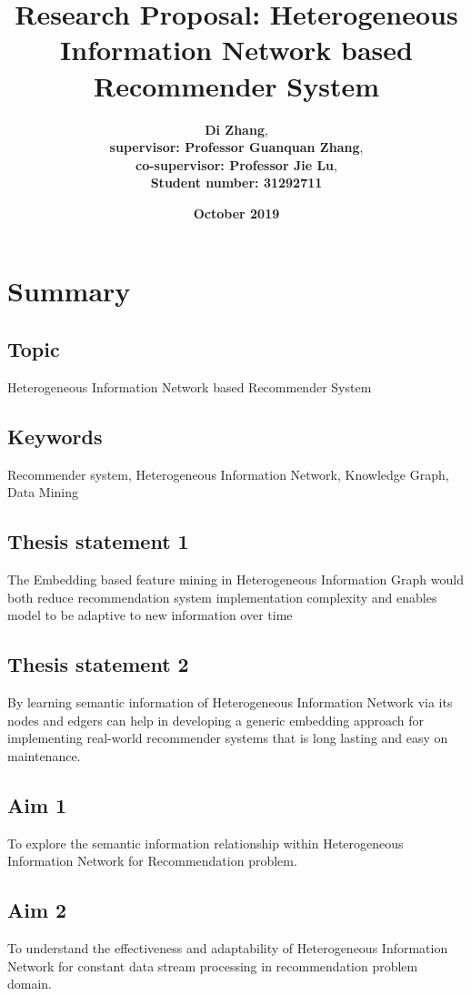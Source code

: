 \documentclass[12pt,a4 paper,title page]{article}
\title{Research Proposal: Heterogeneous Information Network based Recommender System}
\author{\large\textbf{Di Zhang}, \\
\textbf{supervisor: Professor Guanquan Zhang}, \\
\textbf{co-supervisor: Professor Jie Lu}, \\
\textbf{Student number: 31292711}}
\date{\Large{\textbf{October 2019}}}
\theoremstyle{definition}
\begin{document}
\sloppy
\maketitle
\hfill
\hfill

\section*{Summary}

\subsection*{Topic} Heterogeneous Information Network based Recommender System

\subsection*{Keywords} 

Recommender system, Heterogeneous Information Network, Knowledge Graph, Data Mining 

\subsection*{Thesis statement 1}
The Embedding based feature mining in Heterogeneous Information Graph would both reduce recommendation system implementation complexity and enables model to be adaptive to new information over time

\subsection*{Thesis statement 2}
By learning semantic information of Heterogeneous Information Network via its nodes and edgers can help in developing a generic embedding approach for implementing real-world recommender systems that is long lasting and easy on maintenance. 

\subsection*{Aim 1}
To explore the semantic information relationship within Heterogeneous Information Network for Recommendation problem.

\subsection*{Aim 2}
To understand the effectiveness and adaptability of Heterogeneous Information Network for constant data stream processing in recommendation problem domain. 
\end{document}
